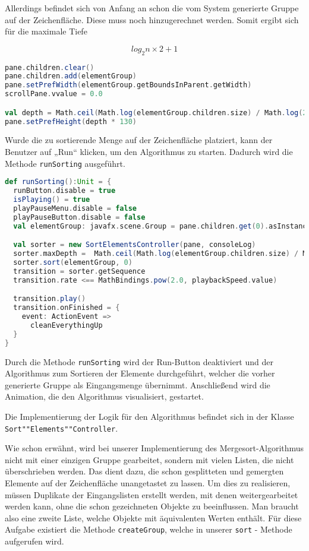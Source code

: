 Allerdings befindet sich von Anfang an schon die vom System generierte Gruppe auf der Zeichenfläche. Diese muss noch hinzugerechnet werden. Somit ergibt sich für die maximale Tiefe

$$log_2 n \times 2 + 1$$

\begin{lstlisting}[language=Scala]
pane.children.clear()
pane.children.add(elementGroup)
pane.setPrefWidth(elementGroup.getBoundsInParent.getWidth)
scrollPane.vvalue = 0.0

val depth = Math.ceil(Math.log(elementGroup.children.size) / Math.log(2)) * 2 + 1
pane.setPrefHeight(depth * 130)
\end{lstlisting}

Wurde die zu sortierende Menge auf der Zeichenfläche platziert, kann der Benutzer auf „Run“ klicken, um den Algorithmus zu starten. Dadurch wird die Methode \texttt{runSorting} ausgeführt.

\begin{lstlisting}[language=Scala,caption=runSorting startet die Sortierung mit anschließender Animationen]
def runSorting():Unit = {
  runButton.disable = true
  isPlaying() = true
  playPauseMenu.disable = false
  playPauseButton.disable = false
  val elementGroup: javafx.scene.Group = pane.children.get(0).asInstanceOf[javafx.scene.Group]

  val sorter = new SortElementsController(pane, consoleLog)
  sorter.maxDepth =  Math.ceil(Math.log(elementGroup.children.size) / Math.log(2)) * 2 + 1
  sorter.sort(elementGroup, 0)
  transition = sorter.getSequence
  transition.rate <== MathBindings.pow(2.0, playbackSpeed.value)

  transition.play()
  transition.onFinished = {
    event: ActionEvent =>
      cleanEverythingUp
  }
}
\end{lstlisting}

Durch die Methode \texttt{runSorting} wird der Run-Button deaktiviert und der Algorithmus zum Sortieren der Elemente durchgeführt, welcher die vorher generierte Gruppe als Eingangsmenge übernimmt. Anschließend wird die Animation, die den Algorithmus visualisiert, gestartet.

Die Implementierung der Logik für den Algorithmus befindet sich in der Klasse \texttt{Sort""Elements""Controller}.

Wie schon erwähnt, wird bei unserer Implementierung des Mergesort-Algorithmus nicht mit einer einzigen Gruppe gearbeitet, sondern mit vielen Listen, die nicht überschrieben werden. Das dient dazu, die schon gesplitteten und gemergten Elemente auf der Zeichenfläche unangetastet zu lassen. Um dies zu realisieren, müssen Duplikate der Eingangslisten erstellt werden, mit denen weitergearbeitet werden kann, ohne die schon gezeichneten Objekte zu beeinflussen. Man braucht also eine zweite Liste, welche Objekte mit äquivalenten Werten enthält. Für diese Aufgabe existiert die Methode \texttt{createGroup}, welche in unserer \texttt{sort} - Methode aufgerufen wird.

